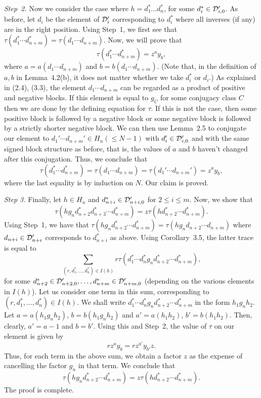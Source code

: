 \begin{pf}
\medskip
{\em  Step~2.} Now  we  consider  the   case where $h=d_1^{*}   \ldots
d_n^{*}$, for some $d_i^{*} \in {\cal D}_{i,0}'$. As before, let $d_i$
be the  element of ${\cal  D}_i'$ corresponding to $d_i^{*}$ where all
inverses  (if any) are  in the right position.  Using Step~1, we first
see   that   $\tau(d_1^{*}    \cdots  d_{n+m}^{*})=   \tau(d_1  \cdots
d_{n+m})$. Now, we will prove that
\[\tau(d_1^{*}\cdots d_{n+m}^{*})=z^a y_{b},\] where 
$a=a(d_1 \cdots d_{n+m})$  and $b=b(d_1 \cdots d_{n+m})$. (Note  that,
in the  definition  of $a,b$ in Lemma~4.2(b),   it does not   matter  
whether we  take $d_i^{*}$ or $d_i$.)  As explained in (2.4),  (3.3), the  
element $d_1 \cdots d_{n+m}$ can be regarded as a  product of positive and 
negative blocks. If this element is equal to $g_C$ for some conjugacy class 
$C$ then we are done by the  defining equation for $\tau$.  If this is not
the case, then some positive block is followed by a negative block or
some  negative    block is followed  by   a  strictly shorter negative
block. We   can  then  use Lemma~2.5 to     conjugate our  element  to
${d_1'} \cdots {d_{n+m}'}  \in H_n(\leq N-1)$ with ${d_i'}
\in  {\cal D}_{i,0}'$ and  with   the same  signed block structure  as
before, that is,  the values of  $a$ and $b$ haven't changed after this
conjugation. Thus, we conclude that
\[ \tau(d_1^{*} \cdots d_{n+m}^{*}) = \tau(d_1 \cdots d_{n+m}) 
  = \tau({d_1'} \cdots  {d_{n+m}'}) = z^ay_b,\] where the last
equality is by induction on $N$.  Our claim is proved.

\medskip
{\em Step 3.} Finally, let $h \in H_n$ and
$d_{n+i}^{*} \in {\cal D}_{n+i,0}'$ for $2 \leq i \leq m$. Now, we show
that \[ \tau(hg_nd_{n+2}^{*}d_{n+3}^{*} \cdots d_{n+m}^{*}) = 
z\tau(hd_{n+2}^{*} \cdots d_{n+m}^{*}). \]
Using Step~1, we have that $\tau(hg_nd_{n+2}^{*} \cdots d_{n+m}^{*})=
\tau(hg_nd_{n+2} \cdots d_{n+m})$ where $d_{n+i} \in {\cal D}_{n+i}'$ 
corresponds to $d_{n+i}^{*}$ as above. Using Corollary~3.5, the latter 
trace is equal to
\[\sum_{(r,d_1^{*},\ldots,d_{n}^{*}) \in I(h)} r\tau(d_1^{*}\cdots d_n^{*}
g_nd_{n+2}^{*}  \cdots  d_{n+m}^{*}),\]  for  some $d_{n+2}^{*} \in {\cal
D}_{n+2,0}',\ldots,d_{n+m}^{*} \in  {\cal D}_{n+m,0}'$ (depending   on
the various elements in $I(h)$).   Let  us consider  one term in  this
sum,  corresponding to   $(r,d_1^{*},  \ldots,d_n^{*}) \in   I(h)$. 
We shall write $d_1^{*} \cdots   d_n^{*}  
g_nd_{n+2}^{*}  \cdots  d_{n+m}^{*}$  in   the  form
$h_1g_nh_2$. Let $a=a(h_1g_nh_2)$, $b=b(h_1g_nh_2)$  and
$a'=a(h_1h_2)$, $b'=b(h_1h_2)$.  Then, clearly,  $a'=a-1$  and $b=b'$.
Using this and Step~2, the value of $\tau$ on our element is given by
\[ rz^ay_{b}=rz^{a'}y_{b'}z.\]
Thus, for each term in the above sum, we obtain a factor $z$ as the
expense of cancelling the factor $g_n$ in that term. We conclude that
\[ \tau(hg_nd_{n+2}^{*} \cdots d_{n+m}^{*})=
z\tau(hd_{n+2}^{*} \cdots d_{n+m}^{*}).\]
The proof is complete.  \end{pf}

